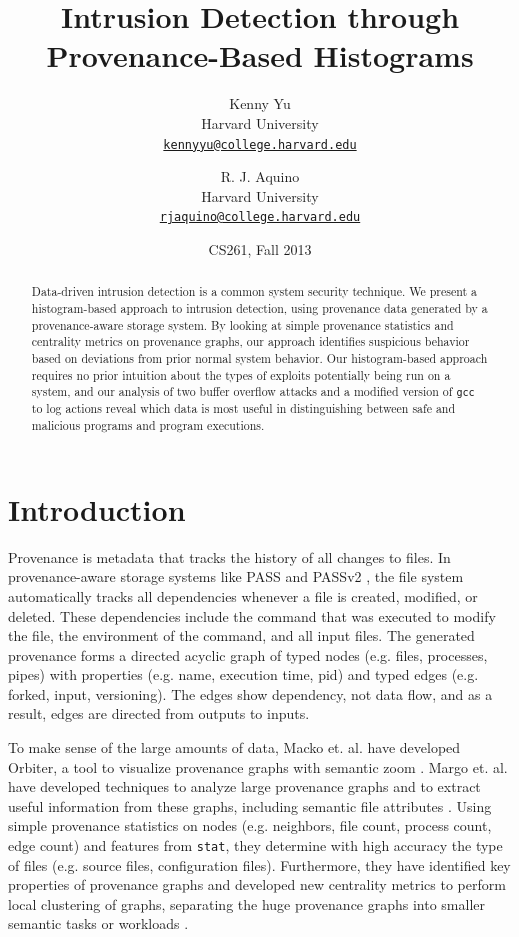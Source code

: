 \documentclass[10pt,twocolumn]{article}
\title{{\bf Intrusion Detection through Provenance-Based Histograms}}
\author{
    Kenny Yu\\
    Harvard University\\
    \href{mailto:kennyyu@college.harvard.edu}{\texttt{kennyyu@college.harvard.edu}}
  \and
    R. J. Aquino\\
    Harvard University\\
    \href{mailto:rjaquino@college.harvard.edu}{\texttt{rjaquino@college.harvard.edu}}
}
\date{CS261, Fall 2013}
\begin{document}
\maketitle

%

\begin{abstract}
Data-driven intrusion detection is a common system security technique. We present a histogram-based approach to intrusion detection, using provenance data generated by a provenance-aware storage system. By looking at simple provenance statistics and centrality metrics on provenance graphs, our approach identifies suspicious behavior based on deviations from prior normal system behavior. Our histogram-based approach requires no prior intuition about the types of exploits potentially being run on a system, and our analysis of two buffer overflow attacks and a modified version of \texttt{gcc} to log actions reveal which data is most useful in distinguishing between safe and malicious programs and program executions.
\end{abstract}

%

\section{Introduction}
Provenance is metadata that tracks the history of all changes to files. In provenance-aware storage systems like PASS \cite{pass} and PASSv2 \cite{passv2}, the file system automatically tracks all dependencies whenever a file is created, modified, or deleted. These dependencies include the command that was executed to modify the file, the environment of the command, and all input files. The generated provenance forms a directed acyclic graph of typed nodes (e.g. files, processes, pipes) with properties (e.g. name, execution time, pid) and typed edges (e.g. forked, input, versioning). The edges show dependency, not data flow, and as a result, edges are directed from outputs to inputs.

To make sense of the large amounts of data, Macko et. al. have developed Orbiter, a tool to visualize provenance graphs with semantic zoom \cite{orbiter}. Margo et. al. have developed techniques to analyze large provenance graphs and to extract useful information from these graphs, including semantic file attributes \cite{fileattributes}. Using simple provenance statistics on nodes (e.g. neighbors, file count, process count, edge count) and features from \texttt{stat}, they determine with high accuracy the type of files (e.g. source files, configuration files). Furthermore, they have identified key properties of provenance graphs and developed new centrality metrics to perform local clustering of graphs, separating the huge provenance graphs into smaller semantic tasks or workloads \cite{clustering}.
\end{document}
